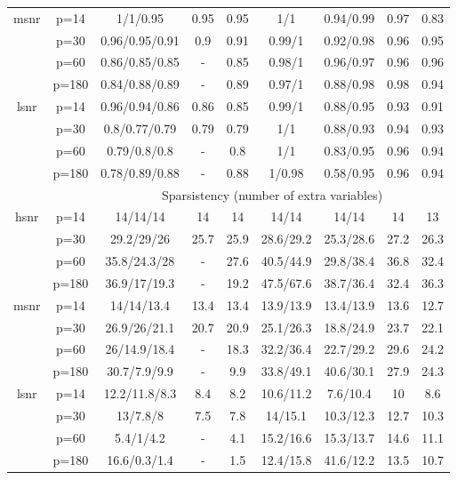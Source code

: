 \begin{table}[ht]
{\begin{tabular}{|c|c|ccccccc|}
  \midrule\multirow{4}[2]{*}{msnr} & p=14 & 1/1/0.95 & 0.95 & 0.95 & 1/1 & 0.94/0.99 & 0.97 & 0.83 \\ 
   & p=30 & 0.96/0.95/0.91 & 0.9 & 0.91 & 0.99/1 & 0.92/0.98 & 0.96 & 0.95 \\ 
   & p=60 & 0.86/0.85/0.85 & - & 0.85 & 0.98/1 & 0.96/0.97 & 0.96 & 0.96 \\ 
   & p=180 & 0.84/0.88/0.89 & - & 0.89 & 0.97/1 & 0.88/0.98 & 0.98 & 0.94 \\ 
  \midrule\multirow{4}[2]{*}{lsnr} & p=14 & 0.96/0.94/0.86 & 0.86 & 0.85 & 0.99/1 & 0.88/0.95 & 0.93 & 0.91 \\ 
   & p=30 & 0.8/0.77/0.79 & 0.79 & 0.79 & 1/1 & 0.88/0.93 & 0.94 & 0.93 \\ 
   & p=60 & 0.79/0.8/0.8 & - & 0.8 & 1/1 & 0.83/0.95 & 0.96 & 0.94 \\ 
   & p=180 & 0.78/0.89/0.88 & - & 0.88 & 1/0.98 & 0.58/0.95 & 0.96 & 0.94 \\ 
   \midrule 
 \multicolumn{1}{|c}{} &       & \multicolumn{7}{c|}{Sparsistency (number of extra variables)} \\
\midrule\multirow{4}[2]{*}{hsnr} & p=14 & 14/14/14 & 14 & 14 & 14/14 & 14/14 & 14 & 13 \\ 
   & p=30 & 29.2/29/26 & 25.7 & 25.9 & 28.6/29.2 & 25.3/28.6 & 27.2 & 26.3 \\ 
   & p=60 & 35.8/24.3/28 & - & 27.6 & 40.5/44.9 & 29.8/38.4 & 36.8 & 32.4 \\ 
   & p=180 & 36.9/17/19.3 & - & 19.2 & 47.5/67.6 & 38.7/36.4 & 32.4 & 36.3 \\ 
  \midrule\multirow{4}[2]{*}{msnr} & p=14 & 14/14/13.4 & 13.4 & 13.4 & 13.9/13.9 & 13.4/13.9 & 13.6 & 12.7 \\ 
   & p=30 & 26.9/26/21.1 & 20.7 & 20.9 & 25.1/26.3 & 18.8/24.9 & 23.7 & 22.1 \\ 
   & p=60 & 26/14.9/18.4 & - & 18.3 & 32.2/36.4 & 22.7/29.2 & 29.6 & 24.2 \\ 
   & p=180 & 30.7/7.9/9.9 & - & 9.9 & 33.8/49.1 & 40.6/30.1 & 27.9 & 24.3 \\ 
  \midrule\multirow{4}[2]{*}{lsnr} & p=14 & 12.2/11.8/8.3 & 8.4 & 8.2 & 10.6/11.2 & 7.6/10.4 & 10 & 8.6 \\ 
   & p=30 & 13/7.8/8 & 7.5 & 7.8 & 14/15.1 & 10.3/12.3 & 12.7 & 10.3 \\ 
   & p=60 & 5.4/1/4.2 & - & 4.1 & 15.2/16.6 & 15.3/13.7 & 14.6 & 11.1 \\ 
   & p=180 & 16.6/0.3/1.4 & - & 1.5 & 12.4/15.8 & 41.6/12.2 & 13.5 & 10.7 \\ 
   \bottomrule 
\end{tabular}
}
\end{table}
